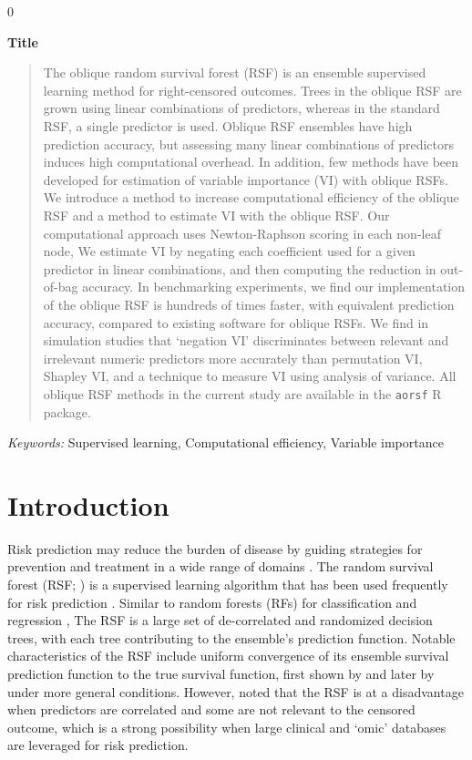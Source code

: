 \documentclass[12pt]{article}\usepackage[]{graphicx}\usepackage[]{xcolor}
\newcommand{\blind}{0}
\begin{document}
\blind
{
  \bigskip
  \bigskip
  \bigskip
  \begin{center}
    {\LARGE\bf Title}
\end{center}
  \medskip
} \fi

\newpage
\begin{abstract}
	The oblique random survival forest (RSF) is an ensemble supervised learning method for right-censored outcomes. Trees in the oblique RSF are grown using linear combinations of predictors, whereas in the standard RSF, a single predictor is used. Oblique RSF ensembles have high prediction accuracy, but assessing many linear combinations of predictors induces high computational overhead. In addition, few methods have been developed for estimation of variable importance (VI) with oblique RSFs. We introduce a method to increase computational efficiency of the oblique RSF and a method to estimate VI with the oblique RSF. Our computational approach uses Newton-Raphson scoring in each non-leaf node, We estimate VI by negating each coefficient used for a given predictor in linear combinations, and then computing the reduction in out-of-bag accuracy. In benchmarking experiments, we find our implementation of the oblique RSF is hundreds of times faster, with equivalent prediction accuracy, compared to existing software for oblique RSFs. We find in simulation studies that `negation VI' discriminates between relevant and irrelevant numeric predictors more accurately than permutation VI, Shapley VI, and a technique to measure VI using analysis of variance. All  oblique RSF methods in the current study are available in the \texttt{aorsf} R package.
\end{abstract}

\noindent%
{\it Keywords:}  Supervised learning, Computational efficiency, Variable importance
\vfill

\newpage
{} %

\section{Introduction}

Risk prediction may reduce the burden of disease by guiding strategies for prevention and treatment in a wide range of domains \citep{moons2012riskI}. The random survival forest (RSF; \citet{ishwaran2008random, hothorn2006unbiased}) is a supervised learning algorithm that has been used frequently for risk prediction \citep{wang2017selective}. Similar to random forests (RFs) for classification and regression \citep{breiman2001random}, The RSF is a large set of de-correlated and randomized decision trees, with each tree contributing to the ensemble's prediction function. Notable characteristics of the RSF include uniform convergence of its ensemble survival prediction function to the true survival function, first shown by \citet{ishwaran2010consistency} and later by \citet{cui2017consistency} under more general conditions. However, \citet{cui2017consistency} noted that the RSF is at a disadvantage when predictors are correlated and some are not relevant to the censored outcome, which is a strong possibility when large clinical and `omic' databases are leveraged for risk prediction.
\end{document}
